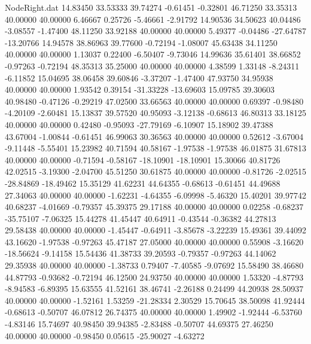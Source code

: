 \begin{filecontents}{NodeRight.dat}
  14.83450   33.53333   39.74274    -0.61451   -0.32801   46.71250   33.35313   40.00000   40.00000    6.46667    0.25726   -5.46661   -2.91792
  14.90536   34.50623   40.04486    -3.08557   -1.47400   48.11250   33.92188   40.00000   40.00000    5.49377   -0.04486  -27.64787  -13.20766
  14.94578   38.86963   39.77600    -0.72194   -1.08007   45.63438   34.11250   40.00000   40.00000    1.13037    0.22400   -6.50407   -9.73046
  14.99636   35.61401   38.66852    -0.97263   -0.72194   48.35313   35.25000   40.00000   40.00000    4.38599    1.33148   -8.24311   -6.11852
  15.04695   38.06458   39.60846    -3.37207   -1.47400   47.93750   34.95938   40.00000   40.00000    1.93542    0.39154  -31.33228  -13.69603
  15.09785   39.30603   40.98480    -0.47126   -0.29219   47.02500   33.66563   40.00000   40.00000    0.69397   -0.98480   -4.20109   -2.60481
  15.13837   39.57520   40.95093    -3.12138   -0.68613   46.80313   33.18125   40.00000   40.00000    0.42480   -0.95093  -27.79169   -6.10907
  15.18902   39.47388   43.67004    -1.00844   -0.61451   46.99063   30.36563   40.00000   40.00000    0.52612   -3.67004   -9.11448   -5.55401
  15.23982   40.71594   40.58167    -1.97538   -1.97538   46.01875   31.67813   40.00000   40.00000   -0.71594   -0.58167  -18.10901  -18.10901
  15.30066   40.81726   42.02515    -3.19300   -2.04700   45.51250   30.61875   40.00000   40.00000   -0.81726   -2.02515  -28.84869  -18.49462
  15.35129   41.62231   44.64355    -0.68613   -0.61451   44.49688   27.34063   40.00000   40.00000   -1.62231   -4.64355   -6.09998   -5.46320
  15.40201   39.97742   40.68237    -4.01669   -0.79357   45.39375   29.17188   40.00000   40.00000    0.02258   -0.68237  -35.75107   -7.06325
  15.44278   41.45447   40.64911    -0.43544   -0.36382   44.27813   29.58438   40.00000   40.00000   -1.45447   -0.64911   -3.85678   -3.22239
  15.49361   39.44092   43.16620    -1.97538   -0.97263   45.47187   27.05000   40.00000   40.00000    0.55908   -3.16620  -18.56624   -9.14158
  15.54436   41.38733   39.20593    -0.79357   -0.97263   44.14062   29.35938   40.00000   40.00000   -1.38733    0.79407   -7.40585   -9.07692
  15.58490   38.46680   44.87793    -0.93682   -0.72194   46.12500   24.93750   40.00000   40.00000    1.53320   -4.87793   -8.94583   -6.89395
  15.63555   41.52161   38.46741    -2.26188    0.24499   44.20938   28.50937   40.00000   40.00000   -1.52161    1.53259  -21.28334    2.30529
  15.70645   38.50098   41.92444    -0.68613   -0.50707   46.07812   26.74375   40.00000   40.00000    1.49902   -1.92444   -6.53760   -4.83146
  15.74697   40.98450   39.94385    -2.83488   -0.50707   44.69375   27.46250   40.00000   40.00000   -0.98450    0.05615  -25.90027   -4.63272

\end{filecontents}

